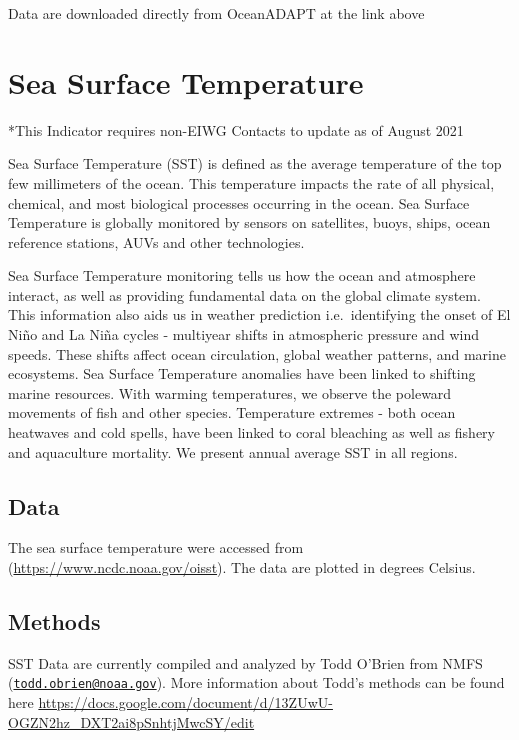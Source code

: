 \documentclass[
]{book}
\begin{document}
Data are downloaded directly from OceanADAPT at the link above

\hypertarget{sea-surface-temperature}{%
\chapter{Sea Surface Temperature}\label{sea-surface-temperature}}

*This Indicator requires non-EIWG Contacts to update as of August 2021

Sea Surface Temperature (SST) is defined as the average temperature of the top few millimeters of the ocean. This temperature impacts the rate of all physical, chemical, and most biological processes occurring in the ocean. Sea Surface Temperature is globally monitored by sensors on satellites, buoys, ships, ocean reference stations, AUVs and other technologies.

Sea Surface Temperature monitoring tells us how the ocean and atmosphere interact, as well as providing fundamental data on the global climate system. This information also aids us in weather prediction i.e.~identifying the onset of El Niño and La Niña cycles - multiyear shifts in atmospheric pressure and wind speeds. These shifts affect ocean circulation, global weather patterns, and marine ecosystems. Sea Surface Temperature anomalies have been linked to shifting marine resources. With warming temperatures, we observe the poleward movements of fish and other species. Temperature extremes - both ocean heatwaves and cold spells, have been linked to coral bleaching as well as fishery and aquaculture mortality. We present annual average SST in all regions.

\hypertarget{data-8}{%
\section{Data}\label{data-8}}

The sea surface temperature were accessed from (\url{https://www.ncdc.noaa.gov/oisst}). The data are plotted in degrees Celsius.

\hypertarget{methods-8}{%
\section{Methods}\label{methods-8}}

SST Data are currently compiled and analyzed by Todd O'Brien from NMFS (\href{mailto:todd.obrien@noaa.gov}{\nolinkurl{todd.obrien@noaa.gov}}). More information about Todd's methods can be found here \url{https://docs.google.com/document/d/13ZUwU-OGZN2hz_DXT2ai8pSnhtjMwcSY/edit}
\end{document}
